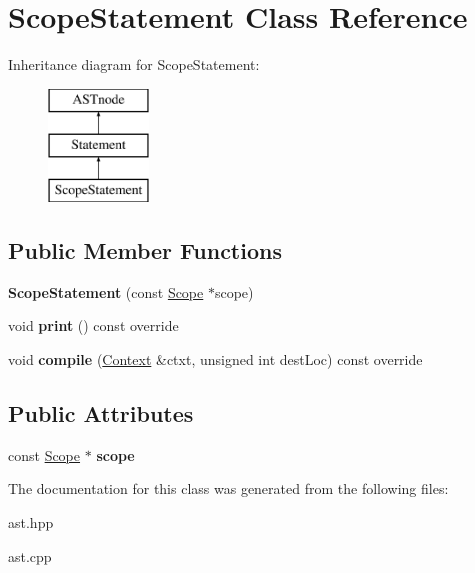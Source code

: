 \hypertarget{class_scope_statement}{}\section{Scope\+Statement Class Reference}
\label{class_scope_statement}
Inheritance diagram for Scope\+Statement\+:\begin{figure}[H]
\begin{center}
\leavevmode
\includegraphics[height=3.000000cm]{class_scope_statement}
\end{center}
\end{figure}
\subsection*{Public Member Functions}
\begin{DoxyCompactItemize}
\item 
\mbox{\label{class_scope_statement_a17c2b8bba07c5042b948468813df0598}} 
{\bfseries Scope\+Statement} (const \hyperlink{class_scope}{Scope} $\ast$scope)
\item 
\mbox{\label{class_scope_statement_ac18275b37ae4396ffbcda7ee03794ba1}} 
void {\bfseries print} () const override
\item 
\mbox{\label{class_scope_statement_a3536a9dd302b5dc617cdd4bab7fe91ce}} 
void {\bfseries compile} (\hyperlink{class_context}{Context} \&ctxt, unsigned int dest\+Loc) const override
\end{DoxyCompactItemize}
\subsection*{Public Attributes}
\begin{DoxyCompactItemize}
\item 
\mbox{\label{class_scope_statement_ad0f3bd2bc12e604f176d7e9046a5ec79}} 
const \hyperlink{class_scope}{Scope} $\ast$ {\bfseries scope}
\end{DoxyCompactItemize}


The documentation for this class was generated from the following files\+:\begin{DoxyCompactItemize}
\item 
ast.\+hpp\item 
ast.\+cpp\end{DoxyCompactItemize}
